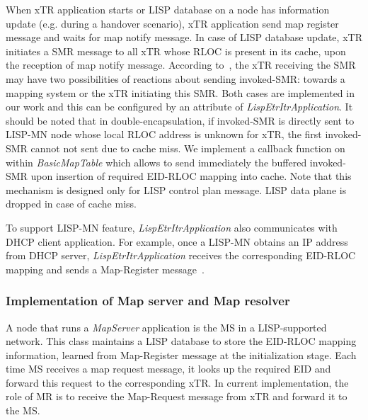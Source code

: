 When xTR application starts or LISP database on a node has information update (e.g. during a handover scenario), xTR application send map register message and waits for map notify message. In case of LISP database update, xTR initiates a SMR message to all xTR whose RLOC is present in its cache, upon the reception of map notify message. According to~\cite{rfc6830}, the xTR receiving the SMR may have two possibilities of reactions about sending invoked-SMR:  towards a mapping system or the xTR initiating this SMR. Both cases are implemented in our work and this can be configured by an attribute of \emph{LispEtrItrApplication}. It should be noted that in double-encapsulation, if invoked-SMR is directly sent to LISP-MN node whose local RLOC address is unknown for xTR, the first invoked-SMR cannot not sent due to cache miss. We implement a callback function on within \emph{BasicMapTable} which allows to send immediately the buffered invoked-SMR upon insertion of required EID-RLOC mapping into cache. Note that this mechanism is designed only for LISP control plan message. LISP data plane is dropped in case of cache miss.

To support LISP-MN feature, \emph{LispEtrItrApplication} also communicates with DHCP client application. For example, once a LISP-MN obtains an IP address from DHCP server, \emph{LispEtrItrApplication} receives the corresponding EID-RLOC mapping and sends a Map-Register message~\cite{meyer-lisp-mn-16}.

\subsubsection{Implementation of Map server and Map resolver}
A node that runs a \emph{MapServer} application is the MS in a LISP-supported network. This class maintains a LISP database to store the EID-RLOC mapping information, learned from Map-Register message at the initialization stage. Each time MS receives a map request message, it looks up the required EID and forward this request to the corresponding xTR. In current implementation, the role of MR is to receive the Map-Request message from xTR and forward it to the MS.

